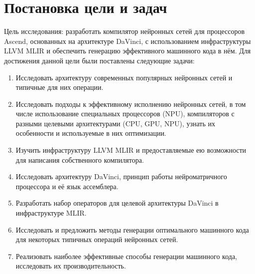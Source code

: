\section{Постановка цели и задач}
\label{sec:Chapter1} 

Цель исследования: разработать компилятор нейронных сетей для процессоров
Ascend, основанных на архитектуре DaVinci, с использованием инфраструктуры
LLVM MLIR и обеспечить генерацию эффективного машинного кода в нём.
Для достижения данной цели были поставлены следующие задачи:

\begin{enumerate}
    \item Исследовать архитектуру современных популярных нейронных сетей
          и типичные для них операции.
    \item Исследовать подходы к эффективному исполнению нейронных сетей,
          в том числе использование специальных процессоров (NPU),
          компиляторов с разными целевыми архитектурами (CPU, GPU, NPU),
          узнать их особенности и используемые в них оптимизации.
    \item Изучить инфраструктуру LLVM MLIR и предоставляемые ею возможности
          для написания собственного компилятора.
    \item Исследовать архитектуру DaVinci, принцип работы нейроматричного
          процессора и её язык ассемблера.
    \item Разработать набор операторов для целевой архитектуры DaVinci в
          инфраструктуре MLIR.
    \item Исследовать и предложить методы генерации оптимального машинного
          кода для некоторых типичных операций нейронных сетей.
    \item Реализовать наиболее эффективные способы генерации машинного кода,
          исследовать их производительность.
\end{enumerate}

\newpage
